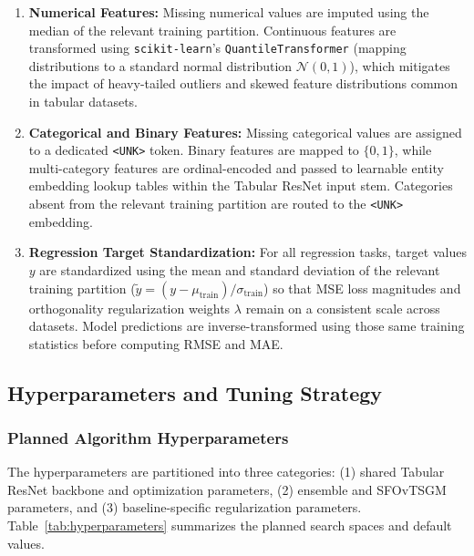 \documentclass[11pt, a4paper]{article}
\begin{document}
\begin{enumerate}
    \item \textbf{Numerical Features:} Missing numerical values are imputed using the median of the relevant training partition. Continuous features are transformed using \texttt{scikit-learn}'s \texttt{QuantileTransformer} (mapping distributions to a standard normal distribution $\mathcal{N}(0, 1)$), which mitigates the impact of heavy-tailed outliers and skewed feature distributions common in tabular datasets.
    \item \textbf{Categorical and Binary Features:} Missing categorical values are assigned to a dedicated \texttt{<UNK>} token. Binary features are mapped to $\{0, 1\}$, while multi-category features are ordinal-encoded and passed to learnable entity embedding lookup tables within the Tabular ResNet input stem. Categories absent from the relevant training partition are routed to the \texttt{<UNK>} embedding.
    \item \textbf{Regression Target Standardization:} For all regression tasks, target values $y$ are standardized using the mean and standard deviation of the relevant training partition ($\tilde{y} = (y - \mu_{\text{train}}) / \sigma_{\text{train}}$) so that MSE loss magnitudes and orthogonality regularization weights $\lambda$ remain on a consistent scale across datasets. Model predictions are inverse-transformed using those same training statistics before computing RMSE and MAE.
\end{enumerate}


\subsection{Hyperparameters and Tuning Strategy}
\subsubsection{Planned Algorithm Hyperparameters}
The hyperparameters are partitioned into three categories: (1) shared Tabular ResNet backbone and optimization parameters, (2) ensemble and SFOvTSGM parameters, and (3) baseline-specific regularization parameters. Table~\ref{tab:hyperparameters} summarizes the planned search spaces and default values.
\end{document}
